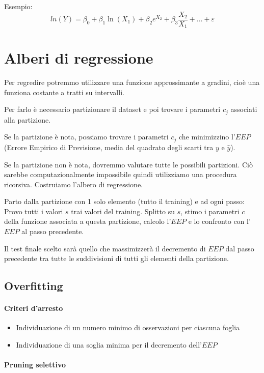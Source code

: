 \documentclass[11pt,onecolumn,a4paper,oneside]{book}
\begin{document}
Esempio:
$$ln(Y) = \beta_0 + \beta_1 \ln (X_1) + \beta_2 e^{X_2} + \beta_3 \frac{X_2}{X_1}+\dots + \varepsilon$$

\section{Alberi di regressione}
Per regredire potremmo utilizzare una funzione approssimante a gradini, cioè una funziona costante a tratti su intervalli.

Per farlo è necessario partizionare il dataset e poi trovare i parametri $c_j$ associati alla partizione.

Se la partizione è nota, possiamo trovare i parametri $c_j$ che minimizzino l'$EEP$ (Errore Empirico di Previsione, media del quadrato degli scarti tra $y$ e $\hat y$).

Se la partizione non è nota, dovremmo valutare tutte le possibili partizioni. Ciò sarebbe computazionalmente impossibile quindi utilizziamo una procedura ricorsiva. Costruiamo l'albero di regressione.

Parto dalla partizione con 1 solo elemento (tutto il training) e ad ogni passo:
Provo tutti i valori $s$ trai valori del training.
Splitto su $s$, stimo i parametri $c$ della funzione associata a questa partizione, calcolo l'$EEP$ e lo confronto con l'$EEP$ al passo precedente.

Il test finale scelto sarà quello che massimizzerà il decremento di $EEP$ dal passo precedente tra tutte le suddivisioni di tutti gli elementi della partizione.

\subsection{Overfitting}

\paragraph{Criteri d'arresto}

\begin{itemize}
\item Individuazione di un numero minimo di osservazioni per ciascuna foglia

\item Individuazione di una soglia minima per il decremento dell'$EEP$
\end{itemize}

\paragraph{Pruning selettivo}
\end{document}
